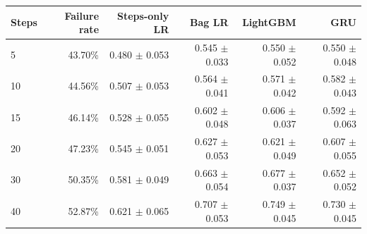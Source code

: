 \begin{tabular}{lrrrrr}
\toprule
Steps & Failure rate & Steps-only LR & Bag LR & LightGBM & GRU \\
\midrule
5 & 43.70\% & 0.480 $\pm$ 0.053 & 0.545 $\pm$ 0.033 & 0.550 $\pm$ 0.052 & 0.550 $\pm$ 0.048 \\
10 & 44.56\% & 0.507 $\pm$ 0.053 & 0.564 $\pm$ 0.041 & 0.571 $\pm$ 0.042 & 0.582 $\pm$ 0.043 \\
15 & 46.14\% & 0.528 $\pm$ 0.055 & 0.602 $\pm$ 0.048 & 0.606 $\pm$ 0.037 & 0.592 $\pm$ 0.063 \\
20 & 47.23\% & 0.545 $\pm$ 0.051 & 0.627 $\pm$ 0.053 & 0.621 $\pm$ 0.049 & 0.607 $\pm$ 0.055 \\
30 & 50.35\% & 0.581 $\pm$ 0.049 & 0.663 $\pm$ 0.054 & 0.677 $\pm$ 0.037 & 0.652 $\pm$ 0.052 \\
40 & 52.87\% & 0.621 $\pm$ 0.065 & 0.707 $\pm$ 0.053 & 0.749 $\pm$ 0.045 & 0.730 $\pm$ 0.045 \\
\bottomrule
\end{tabular}
